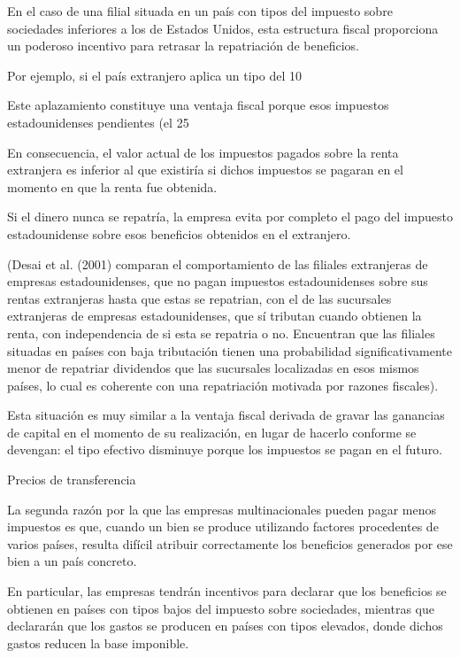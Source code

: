 \documentclass[10pt,a4paper]{article}
\begin{document}
En el caso de una filial situada en un país con tipos del impuesto sobre sociedades inferiores a los de Estados Unidos, esta estructura fiscal proporciona un poderoso incentivo para retrasar la repatriación de beneficios.

Por ejemplo, si el país extranjero aplica un tipo del 10 %

Este aplazamiento constituye una ventaja fiscal porque esos impuestos estadounidenses pendientes (el 25 %

En consecuencia, el valor actual de los impuestos pagados sobre la renta extranjera es inferior al que existiría si dichos impuestos se pagaran en el momento en que la renta fue obtenida.

Si el dinero nunca se repatría, la empresa evita por completo el pago del impuesto estadounidense sobre esos beneficios obtenidos en el extranjero.

(Desai et al. (2001) comparan el comportamiento de las filiales extranjeras de empresas estadounidenses, que no pagan impuestos estadounidenses sobre sus rentas extranjeras hasta que estas se repatrian, con el de las sucursales extranjeras de empresas estadounidenses, que sí tributan cuando obtienen la renta, con independencia de si esta se repatria o no. Encuentran que las filiales situadas en países con baja tributación tienen una probabilidad significativamente menor de repatriar dividendos que las sucursales localizadas en esos mismos países, lo cual es coherente con una repatriación motivada por razones fiscales).

Esta situación es muy similar a la ventaja fiscal derivada de gravar las ganancias de capital en el momento de su realización, en lugar de hacerlo conforme se devengan: el tipo efectivo disminuye porque los impuestos se pagan en el futuro.

Precios de transferencia

La segunda razón por la que las empresas multinacionales pueden pagar menos impuestos es que, cuando un bien se produce utilizando factores procedentes de varios países, resulta difícil atribuir correctamente los beneficios generados por ese bien a un país concreto.

En particular, las empresas tendrán incentivos para declarar que los beneficios se obtienen en países con tipos bajos del impuesto sobre sociedades, mientras que declararán que los gastos se producen en países con tipos elevados, donde dichos gastos reducen la base imponible.
\end{document}
